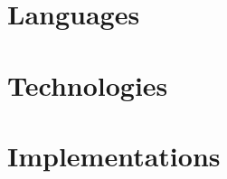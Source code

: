 \documentclass{article}
\begin{document}
\tableofcontents

\pagebreak


\section{Languages}



\pagebreak


\section{Technologies}



\pagebreak


\section{Implementations}


\end{document}
